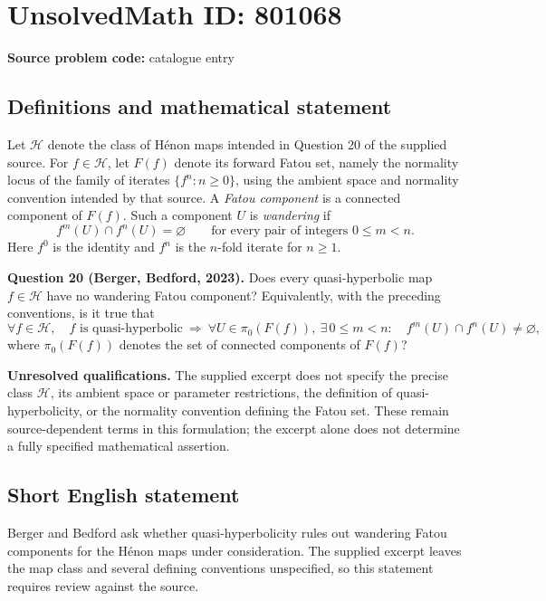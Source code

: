 \documentclass[11pt]{article}
\begin{document}
\section*{UnsolvedMath ID: 801068}
\textbf{Source problem code:} catalogue entry
\subsection{Definitions and mathematical statement}
Let \(\mathcal H\) denote the class of Hénon maps intended in Question 20 of the supplied source. For \(f\in\mathcal H\), let \(F(f)\) denote its forward Fatou set, namely the normality locus of the family of iterates \(\{f^n:n\geq 0\}\), using the ambient space and normality convention intended by that source. A \emph{Fatou component} is a connected component of \(F(f)\). Such a component \(U\) is \emph{wandering} if
\[
 f^m(U)\cap f^n(U)=\varnothing
 \qquad\text{for every pair of integers }0\leq m<n.
\]
Here \(f^0\) is the identity and \(f^n\) is the \(n\)-fold iterate for \(n\geq1\).

\textbf{Question 20 (Berger, Bedford, 2023).} Does every quasi-hyperbolic map \(f\in\mathcal H\) have no wandering Fatou component? Equivalently, with the preceding conventions, is it true that
\[
 \forall f\in\mathcal H,\quad
 f\text{ is quasi-hyperbolic}
 \ \Longrightarrow\ 
 \forall U\in\pi_0(F(f)),\ 
 \exists\,0\leq m<n:\quad
 f^m(U)\cap f^n(U)\neq\varnothing,
\]
where \(\pi_0(F(f))\) denotes the set of connected components of \(F(f)\)?

\textbf{Unresolved qualifications.} The supplied excerpt does not specify the precise class \(\mathcal H\), its ambient space or parameter restrictions, the definition of quasi-hyperbolicity, or the normality convention defining the Fatou set. These remain source-dependent terms in this formulation; the excerpt alone does not determine a fully specified mathematical assertion.
\subsection{Short English statement}
Berger and Bedford ask whether quasi-hyperbolicity rules out wandering Fatou components for the Hénon maps under consideration. The supplied excerpt leaves the map class and several defining conventions unspecified, so this statement requires review against the source.
\end{document}
